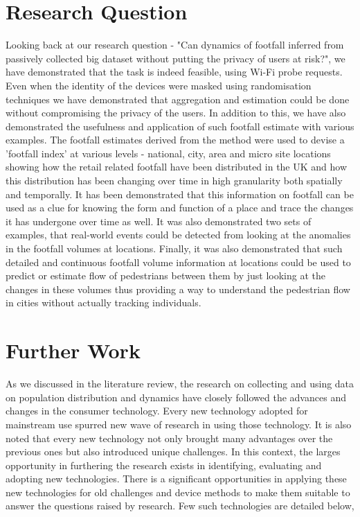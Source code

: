 \section{Research Question}
Looking back at our research question - "Can dynamics of footfall inferred from passively collected big dataset without putting the privacy of users at risk?",
we have demonstrated that the task is indeed feasible, using Wi-Fi probe requests. Even when the identity of the devices were masked using randomisation techniques we have demonstrated that aggregation and estimation could be done without compromising the privacy of the users.
In addition to this, we have also demonstrated the usefulness and application of such footfall estimate with various examples.
The footfall estimates derived from the method were used to devise a 'footfall index' at various levels - national, city, area and micro site locations showing how the retail related footfall have been distributed in the UK and how this distribution has been changing over time in high granularity both spatially and temporally.
It has been demonstrated that this information on footfall can be used as a clue for knowing the form and function of a place and trace the changes it has undergone over time as well.
It was also demonstrated two sets of examples, that real-world events could be detected from looking at the anomalies in the footfall volumes at locations.
Finally, it was also demonstrated that such detailed and continuous footfall volume information at locations could be used to predict or estimate flow of pedestrians between them by just looking at the changes in these volumes thus providing a way to understand the pedestrian flow in cities without actually tracking individuals.

\section{Further Work}

As we discussed in the literature review, the research on collecting and using data on population distribution and dynamics have closely followed the advances and changes in the consumer technology. 
Every new technology adopted for mainstream use spurred new wave of research in using those technology.
It is also noted that every new technology not only brought many advantages over the previous ones but also introduced unique challenges.
In this context, the larges opportunity in furthering the research exists in identifying, evaluating and adopting new technologies.
There is a significant opportunities in applying these new technologies for old challenges and device methods to make them suitable to answer the questions raised by research.
Few such technologies are detailed below,

